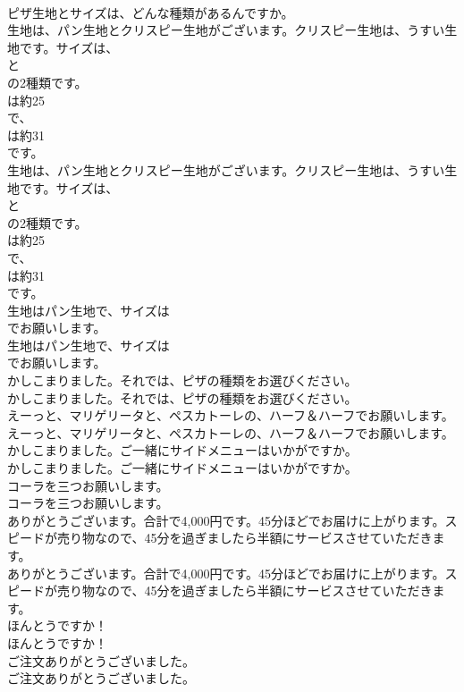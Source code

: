 \documentclass[8pt]{extreport}
\begin{document}
\begin{CJK}{UTF8}{min}
\\	ピザ生地とサイズは、どんな種類があるんですか。 
\\	生地は、パン生地とクリスピー生地がございます。クリスピー生地は、うすい生地です。サイズは、
\\	と
\\	の2種類です。
\\	は約25
\\	で、
\\	は約31
\\	です。	
\\	生地は、パン生地とクリスピー生地がございます。クリスピー生地は、うすい生地です。サイズは、
\\	と
\\	の2種類です。
\\	は約25
\\	で、
\\	は約31
\\	です。 
\\	生地はパン生地で、サイズは
\\	でお願いします。	
\\	生地はパン生地で、サイズは
\\	でお願いします。 
\\	かしこまりました。それでは、ピザの種類をお選びください。	
\\	かしこまりました。それでは、ピザの種類をお選びください。 
\\	えーっと、マリゲリータと、ペスカトーレの、ハーフ＆ハーフでお願いします。	
\\	えーっと、マリゲリータと、ペスカトーレの、ハーフ＆ハーフでお願いします。 
\\	かしこまりました。ご一緒にサイドメニューはいかがですか。	
\\	かしこまりました。ご一緒にサイドメニューはいかがですか。 
\\	コーラを三つお願いします。	
\\	コーラを三つお願いします。 
\\	ありがとうございます。合計で4,000円です。45分ほどでお届けに上がります。スピードが売り物なので、45分を過ぎましたら半額にサービスさせていただきます。	
\\	ありがとうございます。合計で4,000円です。45分ほどでお届けに上がります。スピードが売り物なので、45分を過ぎましたら半額にサービスさせていただきます。 
\\	ほんとうですか！	
\\	ほんとうですか！ 
\\	ご注文ありがとうございました。	
\\	ご注文ありがとうございました。 

\end{CJK}
\end{document}
